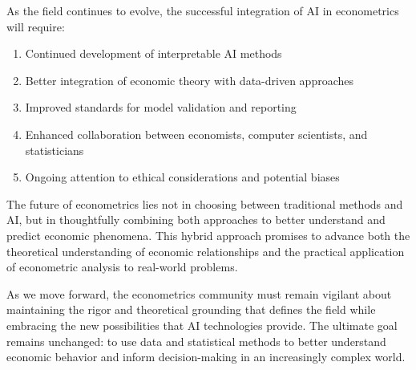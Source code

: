 \documentclass[12pt,a4paper]{article}
\begin{document}
As the field continues to evolve, the successful integration of AI in econometrics will require:

\begin{enumerate}
    \item Continued development of interpretable AI methods
    \item Better integration of economic theory with data-driven approaches
    \item Improved standards for model validation and reporting
    \item Enhanced collaboration between economists, computer scientists, and statisticians
    \item Ongoing attention to ethical considerations and potential biases
\end{enumerate}

The future of econometrics lies not in choosing between traditional methods and AI, but in thoughtfully combining both approaches to better understand and predict economic phenomena. This hybrid approach promises to advance both the theoretical understanding of economic relationships and the practical application of econometric analysis to real-world problems.

As we move forward, the econometrics community must remain vigilant about maintaining the rigor and theoretical grounding that defines the field while embracing the new possibilities that AI technologies provide. The ultimate goal remains unchanged: to use data and statistical methods to better understand economic behavior and inform decision-making in an increasingly complex world.
\end{document}
